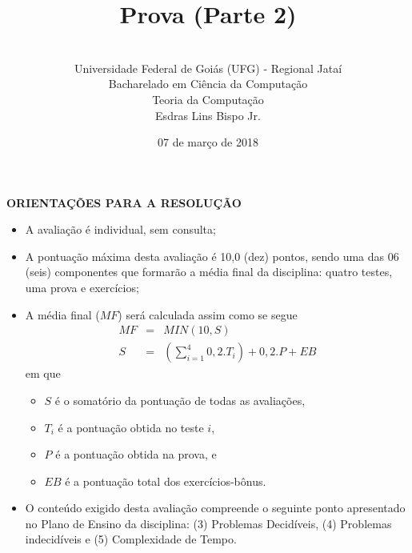 \documentclass[12pt,a4paper,oneside]{article}
\author{\\Universidade Federal de Goiás (UFG) - Regional  Jataí\\Bacharelado em Ciência da Computação \\Teoria da Computação \\Esdras Lins Bispo Jr.}
\date{07 de março de 2018}
\title{\sc \huge Prova (Parte 2)}
\begin{document}
\maketitle

{\bf ORIENTAÇÕES PARA A RESOLUÇÃO}

\small
 
\begin{itemize}
	\item A avaliação é individual, sem consulta;
	\item A pontuação máxima desta avaliação é 10,0 (dez) pontos, sendo uma das 06 (seis) componentes que formarão a média final da disciplina: quatro testes, uma prova e exercícios;
	\item A média final ($MF$) será calculada assim como se segue
	\begin{eqnarray}
		MF & = & MIN(10, S) \nonumber \\
		S & = & (\sum_{i=1}^{4} 0,2.T_i ) + 0,2.P  + EB\nonumber
	\end{eqnarray}
	em que 
	\begin{itemize}
		\item $S$ é o somatório da pontuação de todas as avaliações,
		\item $T_i$ é a pontuação obtida no teste $i$,
		\item $P$ é a pontuação obtida na prova, e
		\item $EB$ é a pontuação total dos exercícios-bônus.
	\end{itemize}
	\item O conteúdo exigido desta avaliação compreende o seguinte ponto apresentado no Plano de Ensino da disciplina: (3) Problemas Decidíveis, (4) Problemas indecidíveis e (5) Complexidade de Tempo.
\end{itemize}

\begin{center}
\end{center}

\newpage
\end{document}
